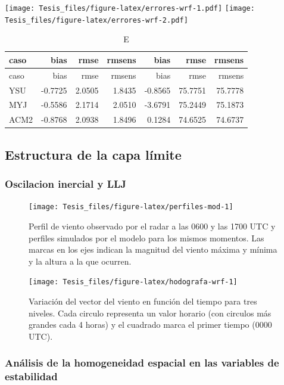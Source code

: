 \documentclass[12pt,spanish,oneside]{book}
\begin{document}
\texttt{[image: Tesis\_files/figure-latex/errores-wrf-1.pdf]}
\texttt{[image: Tesis\_files/figure-latex/errores-wrf-2.pdf]}

\begin{longtable}[]{@{}lrrrrrr@{}}
\caption{E}\tabularnewline
\toprule
caso & bias & rmse & rmsens & bias & rmse & rmsens\tabularnewline
\midrule
\endfirsthead
\toprule
caso & bias & rmse & rmsens & bias & rmse & rmsens\tabularnewline
\midrule
\endhead
YSU & -0.7725 & 2.0505 & 1.8435 & -0.8565 & 75.7751 &
75.7778\tabularnewline
MYJ & -0.5586 & 2.1714 & 2.0510 & -3.6791 & 75.2449 &
75.1873\tabularnewline
ACM2 & -0.8768 & 2.0938 & 1.8496 & 0.1284 & 74.6525 &
74.6737\tabularnewline
\bottomrule
\end{longtable}

\subsection{Estructura de la capa
límite}\label{estructura-de-la-capa-limite}

\subsubsection{Oscilacion inercial y
LLJ}\label{oscilacion-inercial-y-llj}

\begin{figure}

{\centering \texttt{[image: Tesis\_files/figure-latex/perfiles-mod-1]} 

}

\caption{Perfil de viento observado por el radar a las 0600 y las 1700 UTC y perfiles simulados por el modelo para los mismos momentos. Las marcas en los ejes indican la magnitud del viento máxima y mínima y la altura a la que ocurren. \label{perfiles-modelo}}\label{fig:perfiles-mod}
\end{figure}

\begin{figure}

{\centering \texttt{[image: Tesis\_files/figure-latex/hodografa-wrf-1]} 

}

\caption{Variación del vector del viento en función del tiempo para tres niveles. Cada circulo representa un valor horario (con circulos más grandes cada 4 horas) y el cuadrado marca el primer tiempo (0000 UTC). \label{hodografa-wrf}}\label{fig:hodografa-wrf}
\end{figure}

\subsubsection{Análisis de la homogeneidad espacial en las variables de
estabilidad}\label{analisis-de-la-homogeneidad-espacial-en-las-variables-de-estabilidad}
\end{document}
